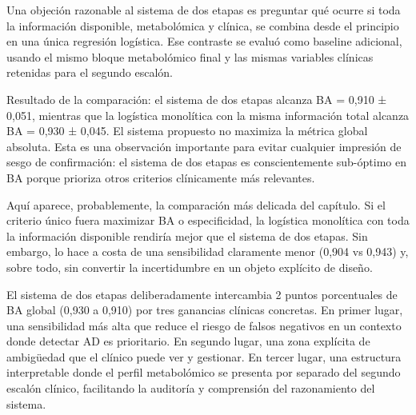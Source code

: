 Una objeción razonable al sistema de dos etapas es preguntar qué ocurre si toda la información disponible, metabolómica y clínica, se combina desde el principio en una única regresión logística. Ese contraste se evaluó como baseline adicional, usando el mismo bloque metabolómico final y las mismas variables clínicas retenidas para el segundo escalón.

Resultado de la comparación: el sistema de dos etapas alcanza BA = 0,910 ± 0,051, mientras que la logística monolítica con la misma información total alcanza BA = 0,930 ± 0,045. El sistema propuesto no maximiza la métrica global absoluta. Esta es una observación importante para evitar cualquier impresión de sesgo de confirmación: el sistema de dos etapas es conscientemente sub-óptimo en BA porque prioriza otros criterios clínicamente más relevantes.

\begin{table}[ht]
\centering
\caption{Comparación entre el sistema final de dos etapas y una logística monolítica con la misma información total, evaluadas sobre el mismo esquema externo.}
\label{tab:monolithic_vs_cascade}
\small
\setlength{\tabcolsep}{4pt}
\end{table}

Aquí aparece, probablemente, la comparación más delicada del capítulo. Si el criterio único fuera maximizar BA o especificidad, la logística monolítica con toda la información disponible rendiría mejor que el sistema de dos etapas. Sin embargo, lo hace a costa de una sensibilidad claramente menor (0,904 vs 0,943) y, sobre todo, sin convertir la incertidumbre en un objeto explícito de diseño.

El sistema de dos etapas deliberadamente intercambia 2 puntos porcentuales de BA global (0,930 a 0,910) por tres ganancias clínicas concretas. En primer lugar, una sensibilidad más alta que reduce el riesgo de falsos negativos en un contexto donde detectar AD es prioritario. En segundo lugar, una zona explícita de ambigüedad que el clínico puede ver y gestionar. En tercer lugar, una estructura interpretable donde el perfil metabolómico se presenta por separado del segundo escalón clínico, facilitando la auditoría y comprensión del razonamiento del sistema.

